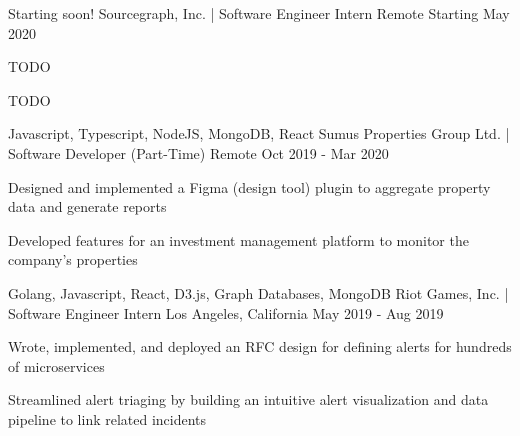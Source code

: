 

\begin{cventries}

  \cventry
    {Starting soon!} %
    {Sourcegraph, Inc. | Software Engineer Intern} %
    {Remote} %
    {Starting May 2020} %
    {
      \begin{cvitems} %
        \item {TODO}
        \item {TODO}
      \end{cvitems}
    }

  \cventry
    {Javascript, Typescript, NodeJS, MongoDB, React} %
    {Sumus Properties Group Ltd. | Software Developer (Part-Time)} %
    {Remote} %
    {Oct 2019 - Mar 2020} %
    {
      \begin{cvitems} %
        \item {Designed and implemented a Figma (design tool) plugin to aggregate property data and generate reports}
        \item {Developed features for an investment management platform to monitor the company's properties}
      \end{cvitems}
    }

  \cventry
    {Golang, Javascript, React, D3.js, Graph Databases, MongoDB} %
    {Riot Games, Inc. | Software Engineer Intern} %
    {Los Angeles, California} %
    {May 2019 - Aug 2019} %
    {
      \begin{cvitems} %
        \item {Wrote, implemented, and deployed an RFC design for defining alerts for hundreds of microservices}
        \item {Streamlined alert triaging by building an intuitive alert visualization and data pipeline to link related incidents}
      \end{cvitems}
    }


\end{cventries}
